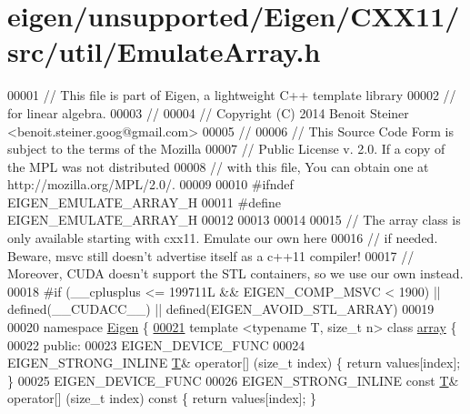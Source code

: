 \hypertarget{eigen_2unsupported_2_eigen_2_c_x_x11_2src_2util_2_emulate_array_8h_source}{}\section{eigen/unsupported/\+Eigen/\+C\+X\+X11/src/util/\+Emulate\+Array.h}
\label{eigen_2unsupported_2_eigen_2_c_x_x11_2src_2util_2_emulate_array_8h_source}

\begin{DoxyCode}
00001 \textcolor{comment}{// This file is part of Eigen, a lightweight C++ template library}
00002 \textcolor{comment}{// for linear algebra.}
00003 \textcolor{comment}{//}
00004 \textcolor{comment}{// Copyright (C) 2014 Benoit Steiner <benoit.steiner.goog@gmail.com>}
00005 \textcolor{comment}{//}
00006 \textcolor{comment}{// This Source Code Form is subject to the terms of the Mozilla}
00007 \textcolor{comment}{// Public License v. 2.0. If a copy of the MPL was not distributed}
00008 \textcolor{comment}{// with this file, You can obtain one at http://mozilla.org/MPL/2.0/.}
00009 
00010 \textcolor{preprocessor}{#ifndef EIGEN\_EMULATE\_ARRAY\_H}
00011 \textcolor{preprocessor}{#define EIGEN\_EMULATE\_ARRAY\_H}
00012 
00013 
00014 
00015 \textcolor{comment}{// The array class is only available starting with cxx11. Emulate our own here}
00016 \textcolor{comment}{// if needed. Beware, msvc still doesn't advertise itself as a c++11 compiler!}
00017 \textcolor{comment}{// Moreover, CUDA doesn't support the STL containers, so we use our own instead.}
00018 \textcolor{preprocessor}{#if (\_\_cplusplus <= 199711L && EIGEN\_COMP\_MSVC < 1900) || defined(\_\_CUDACC\_\_) ||
       defined(EIGEN\_AVOID\_STL\_ARRAY)}
00019 
00020 \textcolor{keyword}{namespace }\hyperlink{namespace_eigen}{Eigen} \{
\hyperlink{class_eigen_1_1array}{00021} \textcolor{keyword}{template} <\textcolor{keyword}{typename} T, \textcolor{keywordtype}{size\_t} n> \textcolor{keyword}{class }\hyperlink{class_eigen_1_1array}{array} \{
00022  \textcolor{keyword}{public}:
00023   EIGEN\_DEVICE\_FUNC
00024   EIGEN\_STRONG\_INLINE \hyperlink{group___sparse_core___module}{T}& operator[] (\textcolor{keywordtype}{size\_t} index) \{ \textcolor{keywordflow}{return} values[index]; \}
00025   EIGEN\_DEVICE\_FUNC
00026   EIGEN\_STRONG\_INLINE \textcolor{keyword}{const} \hyperlink{group___sparse_core___module}{T}& operator[] (\textcolor{keywordtype}{size\_t} index)\textcolor{keyword}{ const }\{ \textcolor{keywordflow}{return} values[index]; \}

\end{DoxyCode}
